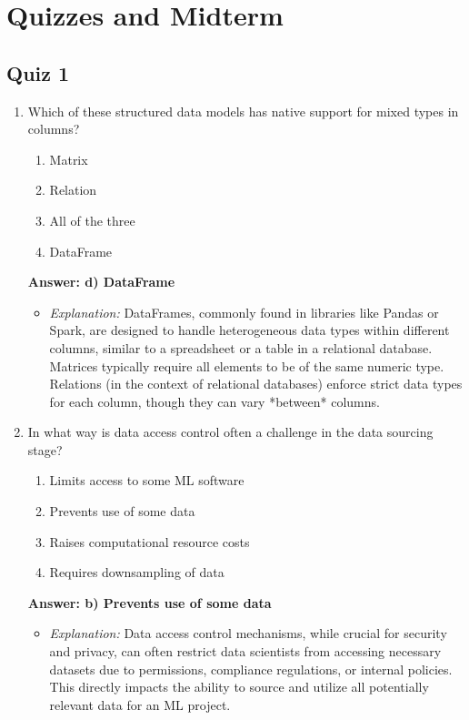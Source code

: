 \documentclass{article}
\begin{document}
\section*{Quizzes and Midterm}

\subsection*{Quiz 1}

\begin{enumerate}[label=\textbf{Question \arabic*.}]

    \item Which of these structured data models has native support for mixed types in columns?
        \begin{enumerate}[label=\alph*)]
            \item Matrix
            \item Relation
            \item All of the three
            \item DataFrame
        \end{enumerate}
        \textbf{Answer: d) DataFrame}
        \begin{itemize}
            \item \textit{Explanation:} DataFrames, commonly found in libraries like Pandas or Spark, are designed to handle heterogeneous data types within different columns, similar to a spreadsheet or a table in a relational database. Matrices typically require all elements to be of the same numeric type. Relations (in the context of relational databases) enforce strict data types for each column, though they can vary *between* columns.
        \end{itemize}
    
    \item In what way is data access control often a challenge in the data sourcing stage?
        \begin{enumerate}[label=\alph*)]
            \item Limits access to some ML software
            \item Prevents use of some data
            \item Raises computational resource costs
            \item Requires downsampling of data
        \end{enumerate}
        \textbf{Answer: b) Prevents use of some data}
        \begin{itemize}
            \item \textit{Explanation:} Data access control mechanisms, while crucial for security and privacy, can often restrict data scientists from accessing necessary datasets due to permissions, compliance regulations, or internal policies. This directly impacts the ability to source and utilize all potentially relevant data for an ML project.
        \end{itemize}
    

\end{enumerate}
\end{document}
